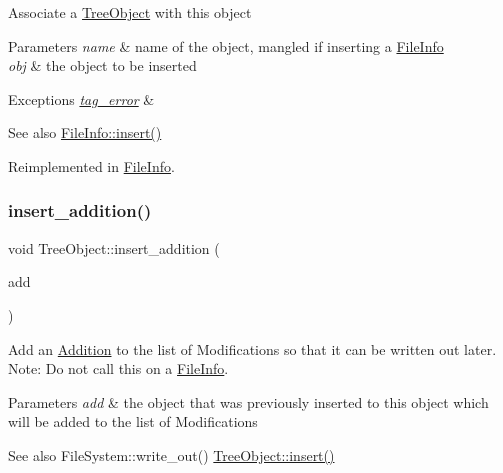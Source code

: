 Associate a \mbox{\hyperlink{class_tree_object}{Tree\+Object}} with this object 
\begin{DoxyParams}{Parameters}
{\em name} & name of the object, mangled if inserting a \mbox{\hyperlink{class_file_info}{File\+Info}} \\
\hline
{\em obj} & the object to be inserted \\
\hline
\end{DoxyParams}

\begin{DoxyExceptions}{Exceptions}
{\em \mbox{\hyperlink{classtag__error}{tag\+\_\+error}}} & \\
\hline
\end{DoxyExceptions}
\begin{DoxySeeAlso}{See also}
\mbox{\hyperlink{class_file_info_ad93a84b63e417b07aa68b619051ab746}{File\+Info\+::insert()}} 
\end{DoxySeeAlso}


Reimplemented in \mbox{\hyperlink{class_file_info_ad93a84b63e417b07aa68b619051ab746}{File\+Info}}.

\mbox{\label{class_tree_object_a41ce6080e0df5adcea4b0a76d35af885}} 
\subsubsection{\texorpdfstring{insert\+\_\+addition()}{insert\_addition()}}
{\footnotesize\ttfamily void Tree\+Object\+::insert\+\_\+addition (\begin{DoxyParamCaption}\item[{\mbox{\hyperlink{class_tree_object}{Tree\+Object}} $\ast$}]{add }\end{DoxyParamCaption})\hspace{0.3cm}{\ttfamily [virtual]}}

Add an \mbox{\hyperlink{class_addition}{Addition}} to the list of Modifications so that it can be written out later. Note\+: Do not call this on a \mbox{\hyperlink{class_file_info}{File\+Info}}. 
\begin{DoxyParams}{Parameters}
{\em add} & the object that was previously inserted to this object which will be added to the list of Modifications \\
\hline
\end{DoxyParams}
\begin{DoxySeeAlso}{See also}
File\+System\+::write\+\_\+out() \mbox{\hyperlink{class_tree_object_af8cc57edba9f435b52ccf33cfbbb2fc6}{Tree\+Object\+::insert()}} 
\end{DoxySeeAlso}


